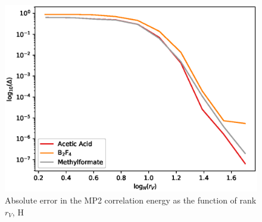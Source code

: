 \begin{figure}[tb]
\includegraphics[width=\columnwidth]{figures/thc_rccsd/mp2_err_ao_full}
\caption{Absolute error in the MP2 correlation energy as the function of rank 
$r_{V}$, H
\label{fig:mp2_err_ao_full}}
\end{figure}
%
